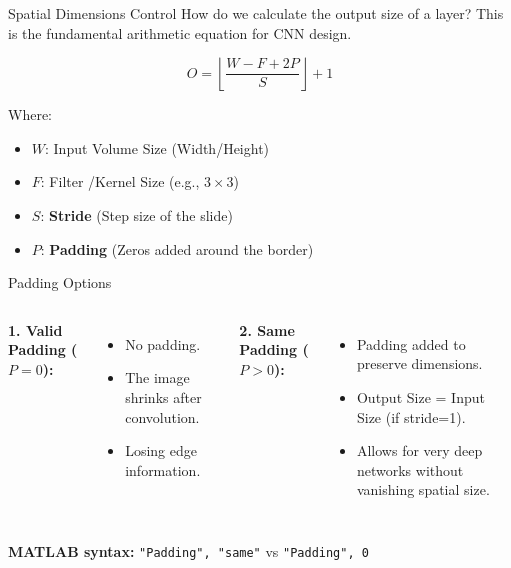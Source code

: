 \documentclass[aspectratio=169,xcolor=dvipsnames]{beamer}
\begin{document}
\begin{frame}{Spatial Dimensions Control}
    How do we calculate the output size of a layer?
    This is the fundamental arithmetic equation for CNN design.
    
    \begin{equation}
        O = \left\lfloor \frac{W - F + 2P}{S} \right\rfloor + 1
    \end{equation}
    
    Where:
    \begin{itemize}
        \item $W$: Input Volume Size (Width/Height)
        \item $F$: Filter /Kernel Size (e.g., $3 \times 3$)
        \item $S$: \textbf{Stride} (Step size of the slide)
        \item $P$: \textbf{Padding} (Zeros added around the border)
    \end{itemize}
\end{frame}


\begin{frame}{Padding Options}
    \begin{columns}
        \textbf{1. Valid Padding ($P=0$):}
        \begin{itemize}
            \item No padding.
            \item The image shrinks after convolution.
            \item Losing edge information.
        \end{itemize}
        
        \textbf{2. Same Padding ($P > 0$):}
        \begin{itemize}
            \item Padding added to preserve dimensions.
            \item Output Size = Input Size (if stride=1).
            \item Allows for very deep networks without vanishing spatial size.
        \end{itemize}
    \end{columns}
    
    \vspace{0.5cm}
    \begin{center}
    \textbf{MATLAB syntax:} \texttt{"Padding", "same"} vs \texttt{"Padding", 0}
    \end{center}
\end{frame}
\end{document}
